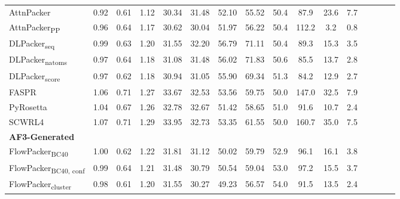\begin{table}
{\begin{tabular}{@{}lccccccccccccccc@{}}
                \textnormal{\hspace{0.5cm}AttnPacker} & 0.92 & 0.61 & 1.12 & 30.34 & 31.48 & 52.10 & 55.52 & 50.4 & 87.9 & 23.6 & 7.7 \\
                \textnormal{\hspace{0.5cm}AttnPacker\textsubscript{PP}} & 0.96 & 0.64 & 1.17 & 30.62 & 30.04 & 51.97 & 56.22 & 50.4 & 112.2 & 3.2 & 0.8 \\
                \textnormal{\hspace{0.5cm}DLPacker\textsubscript{seq}} & 0.99 & 0.63 & 1.20 & 31.55 & 32.20 & 56.79 & 71.11 & 50.4 & 89.3 & 15.3 & 3.5 \\
                \textnormal{\hspace{0.5cm}DLPacker\textsubscript{natoms}} & 0.97 & 0.64 & 1.18 & 31.08 & 31.48 & 56.02 & 71.83 & 50.6 & 85.5 & 13.7 & 2.8 \\
                \textnormal{\hspace{0.5cm}DLPacker\textsubscript{score}} & 0.97 & 0.62 & 1.18 & 30.94 & 31.05 & 55.90 & 69.34 & 51.3 & 84.2 & 12.9 & 2.7 \\
                \textnormal{\hspace{0.5cm}FASPR} & 1.06 & 0.71 & 1.27 & 33.67 & 32.53 & 53.56 & 59.75 & 50.0 & 147.0 & 32.5 & 7.9 \\
                \textnormal{\hspace{0.5cm}PyRosetta} & 1.04 & 0.67 & 1.26 & 32.78 & 32.67 & 51.42 & 58.65 & 51.0 & 91.6 & 10.7 & 2.4 \\
                \textnormal{\hspace{0.5cm}SCWRL4} & 1.07 & 0.71 & 1.29 & 33.95 & 32.73 & 53.35 & 61.55 & 50.0 & 160.7 & 35.0 & 7.5 \\
            \textbf{AF3-Generated} & & & & & & & & & \\ 
                \textnormal{\hspace{0.5cm}FlowPacker\textsubscript{BC40}} & 1.00 & 0.62 & 1.22 & 31.81 & 31.12 & 50.02 & 59.79 & 52.9 & 96.1 & 16.1 & 3.8 \\
                \textnormal{\hspace{0.5cm}FlowPacker\textsubscript{BC40, conf}} & 0.99 & 0.64 & 1.21 & 31.48 & 30.79 & 50.54 & 59.04 & 53.0 & 97.2 & 15.5 & 3.7 \\
                \textnormal{\hspace{0.5cm}FlowPacker\textsubscript{cluster}} & 0.98 & 0.61 & 1.20 & 31.55 & 30.27 & 49.23 & 56.57 & 54.0 & 91.5 & 13.5 & 2.4 \\

\end{tabular}}
\end{table}
